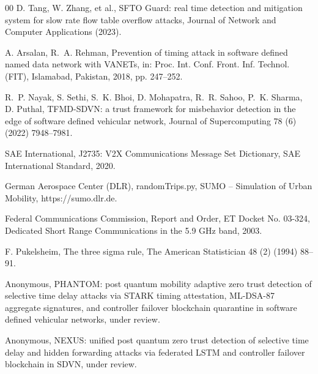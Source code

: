 \documentclass[final,5p,twocolumn]{elsarticle}
\theoremstyle{remark}
\theoremstyle{plain}
\begin{document}
\begin{thebibliography}{00}
	D. Tang, W. Zhang, et al., SFTO Guard: real time detection and mitigation system for slow rate flow table overflow attacks, Journal of Network and Computer Applications (2023).

	A. Arsalan, R.~A. Rehman, Prevention of timing attack in software defined named data network with VANETs, in: Proc. Int. Conf. Front. Inf. Technol. (FIT), Islamabad, Pakistan, 2018, pp. 247--252.

	R.~P. Nayak, S. Sethi, S.~K. Bhoi, D. Mohapatra, R.~R. Sahoo, P.~K. Sharma, D. Puthal, TFMD-SDVN: a trust framework for misbehavior detection in the edge of software defined vehicular network, Journal of Supercomputing 78 (6) (2022) 7948--7981.

	SAE International, J2735: V2X Communications Message Set Dictionary, SAE International Standard, 2020.

	German Aerospace Center (DLR), randomTrips.py, SUMO -- Simulation of Urban Mobility, https://sumo.dlr.de.

	Federal Communications Commission, Report and Order, ET Docket No. 03-324, Dedicated Short Range Communications in the 5.9 GHz band, 2003.

	F. Pukelsheim, The three sigma rule, The American Statistician 48 (2) (1994) 88--91.

	Anonymous, PHANTOM: post quantum mobility adaptive zero trust detection of selective time delay attacks via STARK timing attestation, ML-DSA-87 aggregate signatures, and controller failover blockchain quarantine in software defined vehicular networks, under review.

	Anonymous, NEXUS: unified post quantum zero trust detection of selective time delay and hidden forwarding attacks via federated LSTM and controller failover blockchain in SDVN, under review.

\end{thebibliography}
\end{document}
